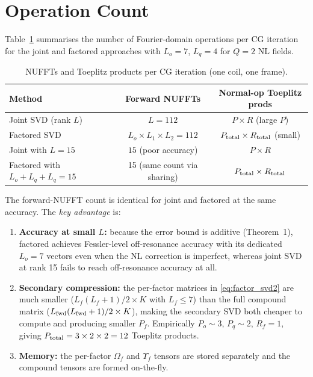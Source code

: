 \documentclass{article}
\begin{document}
\section{Operation Count}

Table~\ref{tab:ops} summarises the number of Fourier-domain operations per CG iteration
for the joint and factored approaches with $L_o = 7$, $L_q = 4$ for $Q=2$ NL fields.

\begin{table}[h]
\centering
\caption{NUFFTs and Toeplitz products per CG iteration (one coil, one frame).}
\label{tab:ops}
\begin{tabular}{lcc}
\toprule
Method & Forward NUFFTs & Normal-op Toeplitz prods \\
\midrule
Joint SVD (rank $L$) & $L = 112$ & $P \times R$ (large $P$) \\
Factored SVD & $L_o \!\times\! L_1 \!\times\! L_2 = 112$ & $P_{\rm total} \times R_{\rm total}$ (small) \\
Joint with $L=15$ & $15$ (poor accuracy) & $P \times R$ \\
Factored with $L_o{+}L_q{+}L_q = 15$ & 15 (same count via sharing) & $P_{\rm total} \times R_{\rm total}$ \\
\bottomrule
\end{tabular}
\end{table}

The forward-NUFFT count is identical for joint and factored at the same accuracy.
The \emph{key advantage} is:
\begin{enumerate}
\item \textbf{Accuracy at small $L$:} because the error bound is additive
(Theorem~1), factored achieves Fessler-level off-resonance accuracy with its
dedicated $L_o = 7$ vectors even when the NL correction is imperfect, whereas
joint SVD at rank 15 fails to reach off-resonance accuracy at all.

\item \textbf{Secondary compression:} the per-factor matrices in
\eqref{eq:factor_svd2} are much smaller ($L_f(L_f+1)/2 \times K$ with $L_f\leq 7$)
than the full compound matrix ($L_{\rm fwd}(L_{\rm fwd}+1)/2 \times K$), making
the secondary SVD both cheaper to compute and producing smaller $P_f$.
Empirically $P_o \sim 3$, $P_q \sim 2$, $R_f = 1$, giving
$P_{\rm total} = 3 \times 2 \times 2 = 12$ Toeplitz products.

\item \textbf{Memory:} the per-factor $\Omega_f$ and $\Upsilon_f$ tensors are
stored separately and the compound tensors are formed on-the-fly.
\end{enumerate}
\end{document}
